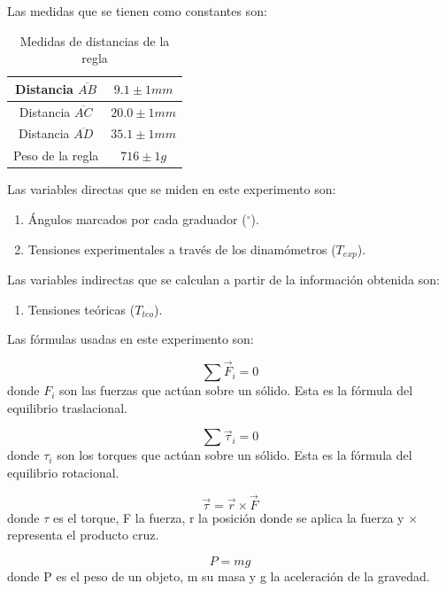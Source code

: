 \documentclass[a4paper]{article}
\begin{document}
Las medidas que se tienen como constantes son: 
\begin{table}[H]
\centering
\begin{tabular}{|c|c|}
    \hline
        Distancia $\overline{AB}$ & $9.1 \pm 1 mm$ \\ \hline
        Distancia $\overline{AC}$ & $20.0 \pm 1 mm$ \\ \hline
        Distancia $\overline{AD}$ & $35.1 \pm 1 mm$ \\ \hline
        Peso de la regla & $716 \pm 1 g$ \\ \hline
        
\end{tabular}
 \caption{Medidas de distancias de la regla}
\end{table}

Las variables directas que se miden en este experimento son:
\begin{enumerate}
  \item Ángulos marcados por cada graduador ($^\circ$).
  \item Tensiones experimentales a través de los dinamómetros ($T_{exp}$).
\end{enumerate}

Las variables indirectas que se calculan a partir de la información obtenida son:
\begin{enumerate}
  \item Tensiones teóricas ($T_{teo}$).
\end{enumerate}

Las fórmulas usadas en este experimento son:

\begin{equation}
    \sum \Vec{F}_i=0
\end{equation}
donde $F_i$ son las fuerzas que actúan sobre un sólido. Esta es la fórmula del equilibrio traslacional.

\begin{equation}
    \sum \Vec{\tau}_i=0
\end{equation}
donde $\tau_i$ son los torques que actúan sobre un sólido. Esta es la fórmula del equilibrio rotacional.

\begin{equation}
    \Vec{\tau}=\Vec{r} \times \Vec{F}
\end{equation}
donde $\tau$ es el torque, F la fuerza, r la posición donde se aplica la fuerza y $\times$ representa el producto cruz. 

\begin{equation}
    P=mg
\end{equation}
donde P es el peso de un objeto, m su masa y g la aceleración de la gravedad.
\end{document}

